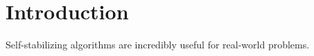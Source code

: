 \section{Introduction}
\label{sec:introduction}

Self-stabilizing algorithms are incredibly useful for real-world problems.

